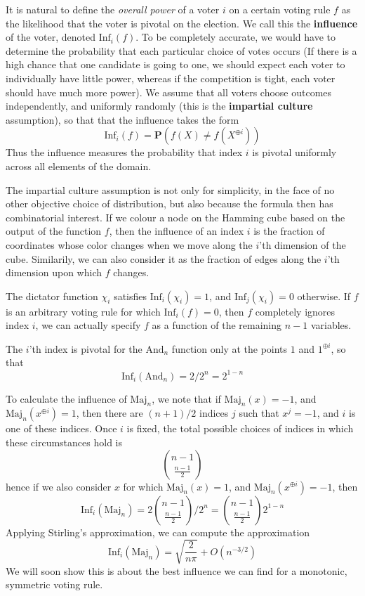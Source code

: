 It is natural to define the {\it overall power} of a voter $i$ on a certain voting rule $f$ as the likelihood that the voter is pivotal on the election. We call this the {\bf influence} of the voter, denoted $\text{Inf}_i(f)$. To be completely accurate, we would have to determine the probability that each particular choice of votes occurs (If there is a high chance that one candidate is going to one, we should expect each voter to individually have little power, whereas if the competition is tight, each voter should have much more power). We assume that all voters choose outcomes independently, and uniformly randomly (this is the {\bf impartial culture} assumption), so that that the influence takes the form
%
\[ \text{Inf}_i(f) = \mathbf{P}(f(X) \neq f(X^{\oplus i})) \]
%
Thus the influence measures the probability that index $i$ is pivotal uniformly across all elements of the domain.

The impartial culture assumption is not only for simplicity, in the face of no other objective choice of distribution, but also because the formula then has combinatorial interest. If we colour a node on the Hamming cube based on the output of the function $f$, then the influence of an index $i$ is the fraction of coordinates whose color changes when we move along the $i$'th dimension of the cube. Similarily, we can also consider it as the fraction of edges along the $i$'th dimension upon which $f$ changes.

\begin{example}
    The dictator function $\chi_i$ satisfies $\text{Inf}_i(\chi_i) = 1$, and $\text{Inf}_j(\chi_i) = 0$ otherwise. If $f$ is an arbitrary voting rule for which $\text{Inf}_i(f) = 0$, then $f$ completely ignores index $i$, we can actually specify $f$ as a function of the remaining $n-1$ variables.
\end{example}

\begin{example}
    The $i$'th index is pivotal for the $\text{And}_n$ function only at the points $1$ and $1^{\oplus i}$, so that
    \[ \text{Inf}_i(\text{And}_n) = 2/2^n = 2^{1-n} \]
\end{example}

\begin{example}
    To calculate the influence of $\text{Maj}_n$, we note that if $\text{Maj}_n(x) = -1$, and $\text{Maj}_n(x^{\oplus i}) = 1$, then there are $(n+1)/2$ indices $j$ such that $x^j = -1$, and $i$ is one of these indices. Once $i$ is fixed, the total possible choices of indices in which these circumstances hold is
    \[ {n - 1 \choose \frac{n-1}{2}} \]
    hence if we also consider $x$ for which $\text{Maj}_n(x) = 1$, and $\text{Maj}_n(x^{\oplus i}) = -1$, then
    \[ \text{Inf}_i(\text{Maj}_n) = 2 {n-1 \choose \frac{n-1}{2}} / 2^n = {n-1 \choose \frac{n-1}{2}} 2^{1-n} \]
    Applying Stirling's approximation, we can compute the approximation
    \[ \text{Inf}_i(\text{Maj}_n) = \sqrt{\frac{2}{n\pi}} + O(n^{-3/2}) \]
    We will soon show this is about the best influence we can find for a monotonic, symmetric voting rule.
\end{example}

